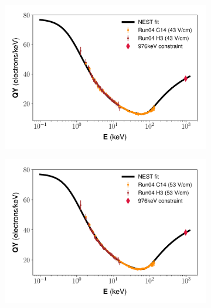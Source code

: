 \begin{figure}[h!]
\centering
\begin{subfigure}{0.5\textwidth}
  \centering
  \includegraphics[width=\textwidth]{Figures/Yields_fit_old/NEST_fit_43Vcm_old_dcm.pdf}
  \caption{}
\end{subfigure}%
\begin{subfigure}{0.5\textwidth}
  \centering
  \includegraphics[width=\textwidth]{Figures/Yields_fit_old/NEST_fit_53Vcm_old_dcm.pdf}
  \caption{}
\end{subfigure}
\begin{subfigure}{0.5\textwidth}
  \centering

\end{subfigure}
\end{figure}

